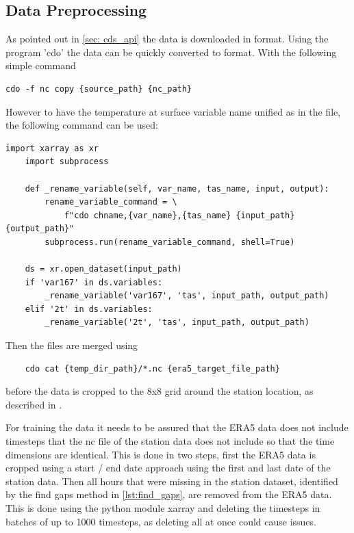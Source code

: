 \subsection{Data Preprocessing}

As pointed out in \autoref{sec: cds_api} the data is downloaded in  format. Using the program 'cdo' the data can be quickly converted to  format.
With the following simple command

\begin{lstlisting}
cdo -f nc copy {source_path} {nc_path}
\end{lstlisting}

However to have the temperature at surface variable name unified as  in the  file, the following command can be used:

\begin{lstlisting}[caption=Renaming Variable in \code{NetCDF} File, label=lst:rename_variable]
    import xarray as xr
    import subprocess

    def _rename_variable(self, var_name, tas_name, input, output):
        rename_variable_command = \
            f"cdo chname,{var_name},{tas_name} {input_path} {output_path}"
        subprocess.run(rename_variable_command, shell=True)
        
    ds = xr.open_dataset(input_path)
    if 'var167' in ds.variables:
        _rename_variable('var167', 'tas', input_path, output_path)
    elif '2t' in ds.variables:
        _rename_variable('2t', 'tas', input_path, output_path)

\end{lstlisting}

Then the files are merged using 

\begin{lstlisting}
    cdo cat {temp_dir_path}/*.nc {era5_target_file_path}
\end{lstlisting}

before the data is cropped to the 8x8 grid around the station location, as described in .

For training the data it needs to be assured that the ERA5 data does not include timesteps that the nc file of the station data does not include so that the time dimensions are identical.
This is done in two steps, first the ERA5 data is cropped using a start / end date approach using the first and last date of the station data.
Then all hours that were missing in the station dataset, identified by the find gaps method in \autoref{lst:find_gaps}, are removed from the ERA5 data.
This is done using the python module xarray and deleting the timesteps in batches of up to 1000 timesteps, as deleting all at once could cause issues.

